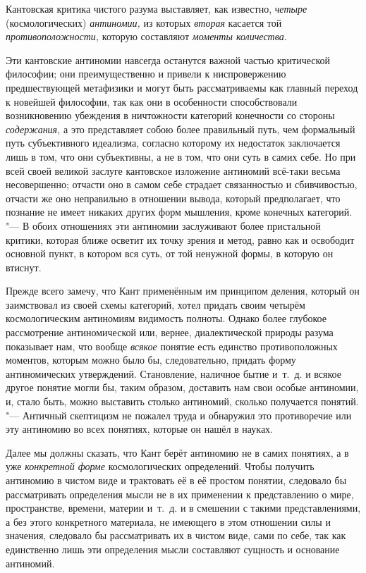 Кантовская критика чистого разума выставляет, как известно, {\em четыре}
(космологических) {\em антиномии,} из которых {\em вторая} касается той
{\em противоположности,} которую составляют {\em моменты количества}.

Эти кантовские антиномии навсегда останутся важной частью критической
философии; они преимущественно и привели к ниспровержению предшествующей
метафизики и могут быть рассматриваемы как главный переход к новейшей
философии, так как они в особенности способствовали возникновению убеждения
в ничтожности категорий конечности со стороны
{\em содержания,} а это представляет собою более
правильный путь, чем формальный путь субъективного идеализма, согласно
которому их недостаток заключается лишь в том, что они субъективны, а не в
том, что они суть в самих себе. Но при всей своей великой заслуге
кантовское изложение антиномий всё-таки весьма несовершенно; отчасти оно в
самом себе страдает связанностью и сбивчивостью, отчасти же оно неправильно
в отношении вывода, который предполагает, что познание не имеет никаких
других форм мышления, кроме конечных категорий. "--- В обоих отношениях эти
антиномии заслуживают более пристальной критики, которая ближе осветит их
точку зрения и метод, равно как и освободит основной пункт, в котором вся
суть, от той ненужной формы, в которую он втиснут.

Прежде всего замечу, что Кант применённым им принципом деления, который он
заимствовал из своей схемы категорий, хотел придать своим четырём
космологическим антиномиям видимость полноты. Однако более глубокое
рассмотрение антиномической или, вернее, диалектической природы разума
показывает нам, что вообще {\em всякое} понятие есть
единство противоположных моментов, которым можно было бы, следовательно,
придать форму антиномических утверждений. Становление, наличное бытие
и~т.~д. и всякое другое понятие могли бы, таким образом, доставить нам свои
особые антиномии, и, стало быть, можно выставить столько антиномий, сколько
получается понятий. "--- Античный скептицизм не пожалел труда и обнаружил это
противоречие или эту антиномию во всех понятиях, которые он нашёл в науках.

Далее мы должны сказать, что Кант берёт антиномию не в самих понятиях, а в
уже {\em конкретной форме} космологических определений.
Чтобы получить антиномию в чистом виде и трактовать её в её простом
понятии, следовало бы рассматривать определения мысли не в их применении к
представлению о мире, пространстве, времени, материи и~т.~д. и в смешении с
такими представлениями, а без этого конкретного материала, не имеющего в
этом отношении силы и значения, следовало бы рассматривать их в чистом
виде, сами по себе, так как единственно лишь эти определения мысли
составляют сущность и основание антиномий.

